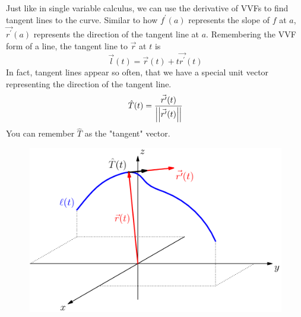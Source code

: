 \noindent
Just like in single variable calculus, we can use the derivative of VVFs to find tangent lines to the curve. Similar to how $f^{\prime}(a)$ represents the slope of $f$ at $a$, $\vec{r^\prime}(a)$ represents the direction of the tangent line at $a$. Remembering the VVF form of a line, the tangent line to $\vec{r}$ at $t$ is 
\begin{equation*}
	\vec{l}(t)=\vec{r}(t)+t\vec{r^\prime}(t)	
\end{equation*}
In fact, tangent lines appear so often, that we have a special unit vector representing the direction of the tangent line.
\begin{equation*}
	\hat{T}(t) = \frac{\vec{r^\prime}(t)}{\left|\left|\vec{r^\prime}(t)\right|\right|}
\end{equation*}
You can remember $\hat{T}$ as the "tangent" vector.

\begin{figure}[h]
	\centering
	\includegraphics[scale=0.33]{Images/vectorValuedFunctions/TangentVector}
\end{figure}